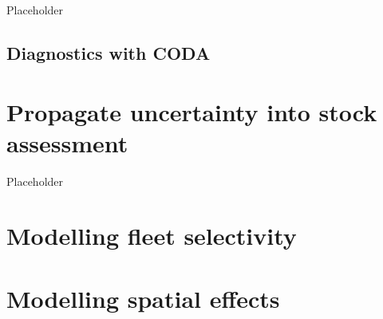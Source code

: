 \documentclass[
]{book}
\begin{document}
Placeholder

\hypertarget{diagnostics-with-coda}{%
\section{Diagnostics with CODA}\label{diagnostics-with-coda}}

\hypertarget{propagate-uncertainty-into-stock-assessment}{%
\chapter{Propagate uncertainty into stock assessment}\label{propagate-uncertainty-into-stock-assessment}}

Placeholder

\hypertarget{modelling-fleet-selectivity}{%
\chapter{Modelling fleet selectivity}\label{modelling-fleet-selectivity}}

\hypertarget{modelling-spatial-effects}{%
\chapter{Modelling spatial effects}\label{modelling-spatial-effects}}
\end{document}
